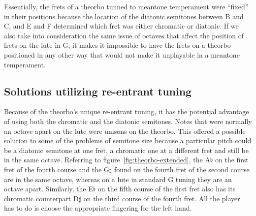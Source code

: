 Essentially, the frets of a theorbo tunned to meantone temperament were ``fixed'' in their
positions because the location of the diatonic semitones between B and C, and E and F
determined which fret was either chromatic or diatonic.  If we also take into
consideration the same issue of octaves that affect the position of frets on the lute in
G, it makes it impossible to have the frets on a theorbo positioned in any other way that
would not make it unplayable in a meantone temperament.

\subsection{Solutions utilizing re-entrant tuning}

Because of the theorbo's unique re-entrant tuning, it has the potential advantage of using
both the chromatic and the diatonic semitones.  Notes that were normally an octave
apart on the lute were unisons on the theorbo.  This offered a possible solution to some
of the problems of semitone size because a particular pitch could be a diatonic semitone
at one fret, a chromatic one at a different fret and still be in the same octave. Referring
to figure~\ref{fig:theorbo-extended}, the A$\flat$ on the first fret of the fourth course
and the G$\sharp$ found on the fourth fret of the second course are in the same octave,
whereas on a lute in standard G tuning they are an octave apart. Similarly, the E$\flat$
on the fifth course of the first fret also has its chromatic counterpart D$\sharp$ on the
third course of the fourth fret.  All the player has to do is choose the appropriate
fingering for the left hand.

